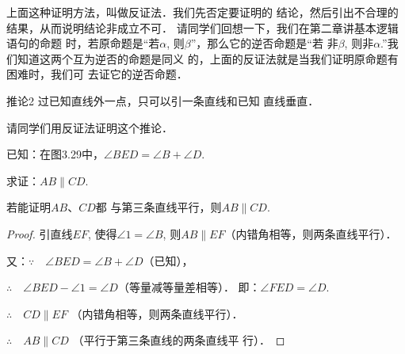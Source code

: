 上面这种证明方法，叫做反证法．我们先否定要证明的
结论，然后引出不合理的结果，从而说明结论非成立不可．
请同学们回想一下，我们在第二章讲基本逻辑语句的命题
时，若原命题是“若$\alpha$, 则$\beta$”，那么它的逆否命题是“若
非$\beta$, 则非$\alpha$.”我们知道这两个互为逆否的命题是同义
的，上面的反证法就是当我们证明原命题有困难时，我们可
去证它的逆否命题．

\begin{blk}
 {推论2} 过已知直线外一点，只可以引一条直线和已知
直线垂直．   
\end{blk}

请同学们用反证法证明这个推论．

\begin{example}
已知：在图3.29中，$\angle BED=\angle B+\angle D$.

求证：$AB\parallel CD$.
\end{example}

\begin{analyze}
    若能证明$AB$、$CD$都
与第三条直线平行，则$AB\parallel CD$.
\end{analyze}

\begin{proof}
    引直线$EF$, 使得$\angle 1=\angle B$, 则$AB\parallel EF$（内错角相等，则两条直线平行）．

又：$\because\quad \angle BED=\angle B+\angle D$（已知），

$\therefore\quad \angle BED-\angle 1=\angle D$（等量减等量差相等）．
即：$\angle FED=\angle D$.

$\therefore\quad CD\parallel EF$ （内错角相等，则两条直线平行）．

$\therefore\quad AB\parallel CD$ （平行于第三条直线的两条直线平
行）．
\end{proof}

\begin{figure}[htp]\centering
    \begin{minipage}[t]{0.48\textwidth}
    \centering
{}
    \caption{}
    \end{minipage}
    \begin{minipage}[t]{0.48\textwidth}
    \centering
    \caption{}
    \end{minipage}
    \end{figure}

